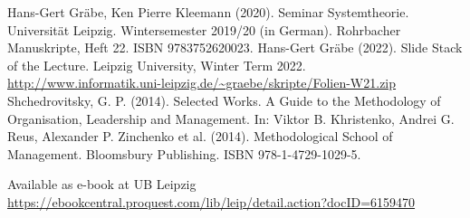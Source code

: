 \documentclass[11pt,a4paper]{article}
\begin{document}
\begin{thebibliography}{xxx}
 Hans-Gert Gräbe, Ken Pierre Kleemann (2020). Seminar
  Systemtheorie. Universität Leipzig. Wintersemester 2019/20 (in German).
  Rohrbacher Manuskripte, Heft 22. ISBN 9783752620023.
 Hans-Gert Gräbe (2022). Slide Stack of the Lecture.
  Leipzig University, Winter Term 2022.\\
  \url{http://www.informatik.uni-leipzig.de/~graebe/skripte/Folien-W21.zip}
 Shchedrovitsky, G. P. (2014). Selected Works. A Guide to the
  Methodology of Organisation, Leadership and Management. In: Viktor
  B. Khristenko, Andrei G. Reus, Alexander P. Zinchenko et
  al. (2014). Methodological School of Management. Bloomsbury Publishing.
  ISBN 978-1-4729-1029-5.

  Available as e-book at UB Leipzig\\
  \url{https://ebookcentral.proquest.com/lib/leip/detail.action?docID=6159470}
\end{thebibliography}
\end{document}
